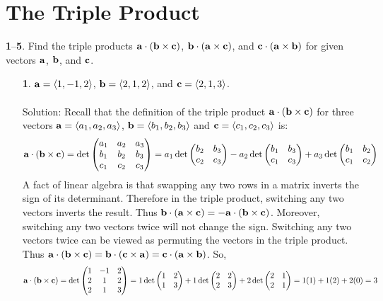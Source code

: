 \documentclass[12pt]{amsbook}
\newcommand{\la}{\langle}
\newcommand{\ra}{\rangle}
\begin{document}
\newpage
\section{The Triple Product}


\noindent
{\small\bf 1}--{\small\bf 5}. Find the triple products 
${\bf a}\cdot({\bf b}\times {\bf c})$,  
${\bf b}\cdot({\bf a}\times {\bf c})$, and 
${\bf c}\cdot({\bf a}\times {\bf b})$
for given vectors ${\bf a}$, ${\bf b}$, and ${\bf c}$.
\begin{enumerate}
  \item[{\small\bf 1}.] ${\bf a}=\la 1,-1,2\ra$, ${\bf b}=
\la 2,1,2\ra$, and ${\bf c}=\la 2,1,3\ra$.
\\
\\
{\sc Solution}:
Recall that the definition of the triple product ${\bf a}\cdot({\bf b}\times{\bf c})$ for three vectors ${\bf a}=\la a_1,a_2,a_3 \ra$, ${\bf b}=\la b_1,b_2,b_3 \ra$ and ${\bf c}=\la c_1,c_2,c_3 \ra$ is:
$${\bf a}\cdot({\bf b}\times{\bf c})=\det
\begin{pmatrix}
a_1 & a_2 & a_3\cr b_1&b_2&b_3\cr c_1&c_2&c_3 \end{pmatrix}=a_1\det\begin{pmatrix}b_2&b_3\cr c_2&c_3  \end{pmatrix}-a_2\det\begin{pmatrix}b_1&b_3\cr c_1&c_3  \end{pmatrix}+a_3\det\begin{pmatrix}b_1&b_2\cr c_1&c_2 \end{pmatrix} $$
A fact of linear algebra is that swapping any two rows in a matrix inverts the sign of its determinant. Therefore in the triple product, switching any two vectors inverts the result. Thus ${\bf b}\cdot({\bf a}\times{\bf c})=-{\bf a}\cdot({\bf b}\times{\bf c})$. Moreover, switching any two vectors twice will not change the sign. Switching any two vectors twice can be viewed as permuting the vectors in the triple product. Thus ${\bf a}\cdot({\bf b}\times{\bf c})={\bf b}\cdot({\bf c}\times{\bf a})={\bf c}\cdot({\bf a}\times{\bf b})$. So,
$${\bf a}\cdot({\bf b}\times{\bf c})=\det
\begin{pmatrix}
1 & -1 & 2\cr 2&1&2\cr 2&1&3 \end{pmatrix}=1\det\begin{pmatrix}1&2\cr 1&3  \end{pmatrix}+1\det\begin{pmatrix}2&2\cr 2&3  \end{pmatrix}+2\det\begin{pmatrix}2&1\cr 2&1 \end{pmatrix}=1(1)+1(2)+2(0)=3 $$

\end{enumerate}
\end{document}
